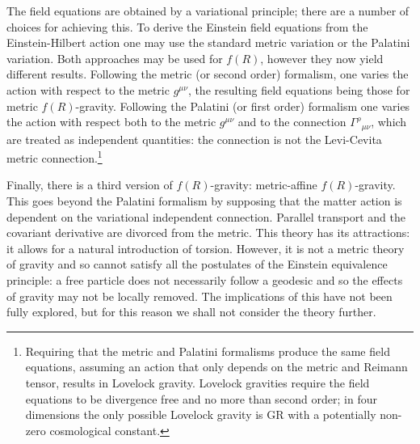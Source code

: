 The field equations are obtained by a variational principle; there are a number of choices for achieving this. To derive the Einstein field equations from the Einstein-Hilbert action one may use the standard metric variation or the Palatini variation\cite{Misner1973}. Both approaches may be used for $f(R)$, however they now yield different results\cite{Sotiriou2010, DeFelice2010}. Following the metric (or second order) formalism, one varies the action with respect to the metric $g^{\mu\nu}$, the resulting field equations being those for metric $f(R)$-gravity. Following the Palatini (or first order) formalism one varies the action with respect both to the metric $g^{\mu\nu}$ and to the connection ${\Gamma^\rho}_{\mu\nu}$, which are treated as independent quantities: the connection is not the Levi-Cevita metric connection.\footnote{Requiring that the metric and Palatini formalisms produce the same field equations, assuming an action that only depends on the metric and Reimann tensor, results in Lovelock gravity\cite{Exirifard2008}. Lovelock gravities require the field equations to be divergence free and no more than second order; in four dimensions the only possible Lovelock gravity is GR with a potentially non-zero cosmological constant\cite{Lovelock1970, Lovelock1971, Lovelock1972}.}

Finally, there is a third version of $f(R)$-gravity: metric-affine $f(R)$-gravity\cite{Sotiriou2007, Sotiriou2007b}. This goes beyond the Palatini formalism by supposing that the matter action is dependent on the variational independent connection. Parallel transport and the covariant derivative are divorced from the metric. This theory has its attractions: it allows for a natural introduction of torsion. However, it is not a metric theory of gravity and so cannot satisfy all the postulates of the Einstein equivalence principle\cite{Will2006}: a free particle does not necessarily follow a geodesic and so the effects of gravity may not be locally removed\cite{Exirifard2008}. The implications of this have not been fully explored, but for this reason we shall not consider the theory further.

